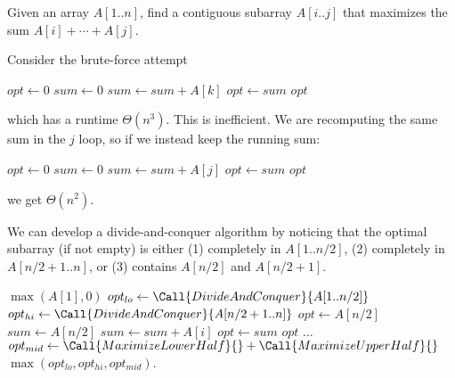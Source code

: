 \begin{xca}
  Given an array $A[1..n]$, find a contiguous subarray $A[i..j]$ that maximizes the sum $A[i] + \dotsb + A[j]$.
\end{xca}

Consider the brute-force attempt
\begin{algorithm}[H]
  \caption{}
  \begin{algorithmic}[1]
    \State $opt \gets 0$
    \State $sum \gets 0$
    \State $sum \gets sum + A[k]$
    \EndFor
     \State $opt \gets sum$ \EndIf
    \EndFor
    \EndFor
    \State \Return $opt$
  \end{algorithmic}
\end{algorithm}
which has a runtime $\Theta(n^3)$.
This is inefficient.
We are recomputing the same sum in the $j$ loop,
so if we instead keep the running sum:
\begin{algorithm}[H]
  \caption{}
  \begin{algorithmic}[1]
    \State $opt \gets 0$
    \State $sum \gets 0$
    \State $sum \gets sum + A[j]$
     \State $opt \gets sum$ \EndIf
    \EndFor
    \EndFor
    \State \Return $opt$
  \end{algorithmic}
\end{algorithm}
we get $\Theta(n^2)$.

We can develop a divide-and-conquer algorithm by noticing that
the optimal subarray (if not empty) is either
(1) completely in $A[1..n/2]$,
(2) completely in $A[n/2+1..n]$,
or (3) contains $A[n/2]$ and $A[n/2+1]$.

\begin{algorithm}
  \caption{}
  \begin{algorithmic}[1]
     \Return $\max(A[1],0)$ \EndIf
    \State $opt_{lo} \gets \Call{DivideAndConquer}{A[1..n/2]}$
    \State $opt_{hi} \gets \Call{DivideAndConquer}{A[n/2+1..n]}$
    \State $opt \gets A[n/2]$
    \State $sum \gets A[n/2]$
    \State $sum \gets sum + A[i]$
     $opt \gets sum$ \EndIf
    \EndFor
    \State \Return $opt$
    \EndFunction
    \State $\dots$
    \EndFunction
    \State $opt_{mid} \gets \Call{MaximizeLowerHalf}{\null} + \Call{MaximizeUpperHalf}{\null}$
    \State \Return $\max(opt_{lo},opt_{hi},opt_{mid})$.
  \end{algorithmic}
\end{algorithm}

